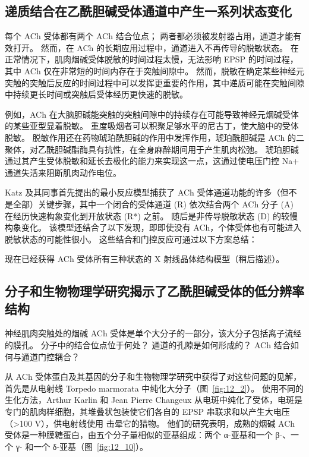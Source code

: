 \subsection{递质结合在乙酰胆碱受体通道中产生一系列状态变化}

每个 ACh 受体都有两个 ACh 结合位点；
两者都必须被发射器占用，通道才能有效打开。
然而，在 ACh 的长期应用过程中，通道进入不再传导的脱敏状态。
在正常情况下，肌肉烟碱受体脱敏的时间过程太慢，无法影响 EPSP 的时间过程，其中 ACh 仅在非常短的时间内存在于突触间隙中。
然而，脱敏在确定某些神经元突触的突触后反应的时间过程中可以发挥更重要的作用，其中递质可能在突触间隙中持续更长时间或突触后受体经历更快速的脱敏。


例如，ACh 在大脑胆碱能突触的突触间隙中的持续存在可能导致神经元烟碱受体的某些亚型显着脱敏。
重度吸烟者可以积聚足够水平的尼古丁，使大脑中的受体脱敏。
脱敏作用还在药物琥珀酰胆碱的作用中发挥作用，琥珀酰胆碱是 ACh 的二聚体，对乙酰胆碱酯酶具有抗性，在全身麻醉期间用于产生肌肉松弛。
琥珀胆碱通过其产生受体脱敏和延长去极化的能力来实现这一点，这通过使电压门控 Na+ 通道失活来阻断肌肉动作电位。


Katz 及其同事首先提出的最小反应模型捕获了 ACh 受体通道功能的许多（但不是全部）关键步骤，其中一个闭合的受体通道 (R) 依次结合两个 ACh 分子 (A) 在经历快速构象变化到开放状态 (R*) 之前。
随后是非传导脱敏状态 (D) 的较慢构象变化。
该模型还结合了以下发现，即即使没有 ACh，个体受体也有可能进入脱敏状态的可能性很小。
这些结合和门控反应可通过以下方案总结：


现在已经获得 ACh 受体所有三种状态的 X 射线晶体结构模型（稍后描述）。



\subsection{分子和生物物理学研究揭示了乙酰胆碱受体的低分辨率结构}

神经肌肉突触处的烟碱 ACh 受体是单个大分子的一部分，该大分子包括离子流经的膜孔。
分子中的结合位点位于何处？ 通道的孔隙是如何形成的？ ACh 结合如何与通道门控耦合？


从 ACh 受体蛋白及其基因的分子和生物物理学研究中获得了对这些问题的见解，首先是从电射线 Torpedo marmorata 中纯化大分子（图~\ref{fig:12_2}）。
使用不同的生化方法，Arthur Karlin 和 Jean Pierre Changeux 从电斑中纯化了受体，电斑是专门的肌肉样细胞，其堆叠状包装使它们各自的 EPSP 串联求和以产生大电压（>100 V），供电射线使用 击晕它的猎物。
他们的研究表明，成熟的烟碱 ACh 受体是一种膜糖蛋白，由五个分子量相似的亚基组成：两个 α-亚基和一个 β-、一个 γ- 和一个 δ-亚基（图~\ref{fig:12_10}）。


